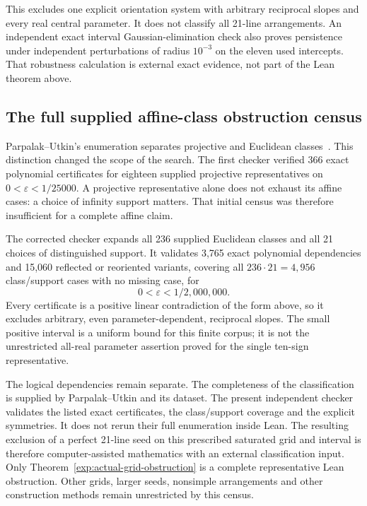This excludes one explicit orientation system with arbitrary reciprocal
slopes and every real central parameter. It does not classify all
21-line arrangements. An independent exact interval Gaussian-elimination
check also proves persistence under independent perturbations of radius
$10^{-3}$ on the eleven used intercepts. That robustness calculation is
external exact evidence, not part of the Lean theorem above.

\subsection{The full supplied affine-class obstruction census}
\label{exp:affine-census}

Parpalak--Utkin's enumeration separates projective and Euclidean
classes~\cite{parpalakutkinEnumeration2026}. This distinction changed
the scope of the search. The first checker verified 366 exact polynomial
certificates for eighteen supplied projective representatives on
$0<\varepsilon<1/25000$. A projective representative alone does not
exhaust its affine cases: a choice of infinity support matters. That
initial census was therefore insufficient for a complete affine claim.

The corrected checker expands all 236 supplied Euclidean classes and
all 21 choices of distinguished support. It validates 3,765 exact
polynomial dependencies and 15,060 reflected or reoriented variants,
covering all $236\cdot21=4,956$ class/support cases with no missing case,
for
\begin{equation}
 0<\varepsilon<1/2{,}000{,}000.
 \label{exp:census-interval}
\end{equation}
Every certificate is a positive linear contradiction of the form above,
so it excludes arbitrary, even parameter-dependent, reciprocal slopes.
The small positive interval is a uniform bound for this finite corpus;
it is not the unrestricted all-real parameter assertion proved for the
single ten-sign representative.

The logical dependencies remain separate. The completeness of the
classification is supplied by Parpalak--Utkin and its dataset. The
present independent checker validates the listed exact certificates,
the class/support coverage and the explicit symmetries. It does not
rerun their full enumeration inside Lean. The resulting exclusion of a
perfect 21-line seed on this prescribed saturated grid and interval is
therefore computer-assisted mathematics with an external classification
input. Only Theorem~\ref{exp:actual-grid-obstruction} is a complete
representative Lean obstruction. Other grids, larger seeds, nonsimple
arrangements and other construction methods remain unrestricted by this
census.

